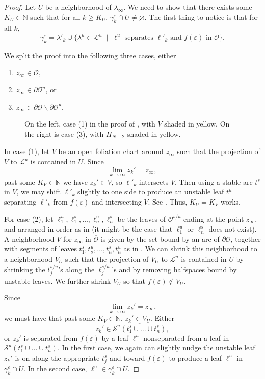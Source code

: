 \documentclass[10pt,a4paper]{amsart}
\newcommand{\N}{\mathbb{N}}
\renewcommand{\l}{\lambda}
\newcommand{\mc}{\mathcal}
\newcommand{\orb}{\mathcal{O}}
\newcommand\ssm{\smallsetminus}
\newcommand{\vep}{\varepsilon}
\begin{document}
\begin{proof}
	Let $U$ be a neighborhood of $\l_\infty$. We need to show that there exists some $K_U\in\N$ such that for all $k\geq K_U$, $\gamma^\vep_k\cap U\neq\varnothing$. The first thing to notice is that for all $k$,
	\[
	\gamma_k^\vep=\l'_k\cup\{\l^u\in\mc L^u\;\mid\;\ell^u\text{ separates }\ell'_k\text{ and }f(\vep)\text{ in }\overline{\orb}\}.
	\]
	
	We split the proof into the following three cases, either 
	\begin{enumerate}
		\item $z_\infty\in\orb$,
		\item $z_\infty\in\partial\orb^u$, or
		\item $z_\infty\in\partial\orb\ssm\partial\orb^u$.
	\end{enumerate}
	
	\begin{figure}[h]
		\centering
		
		\caption{On the left, case (1) in the proof of , with $V$ shaded in yellow. On the right is case (3), with $H_{N+2}$ shaded in yellow.}\label{fig:linf_ray}
	\end{figure}

	In case (1), let $V$ be an open foliation chart around $z_\infty$ such that the projection of $V$ to $\mc L^u$ is contained in $U$. Since 
	\[
	\lim_{k\to\infty}z_k'=z_\infty,
	\]
	past some $K_V\in\N$ we have $z_k'\in V$, so $\ell'_k$ intersects $V$. Then using a stable arc $t^s$ in $V$, we may shift $\ell'_k$ slightly to one side to produce an unstable leaf $t^u$ separating $\ell'_k$ from $f(\vep)$ and intersecting $V$. See . Thus, $K_U=K_V$ works.
	
	For case (2), let $\ell_1^u,\ell^s_1,\ldots,\ell^u_n,\ell^s_n$ be the leaves of $\orb^{s/u}$ ending at the point $z_\infty$, and arranged in order as in  (it might be the case that $\ell_1^u$ or $\ell^s_n$ does not exist). A neighborhood $V$ for $z_\infty$ in $\overline{\orb}$ is given by the set bound by an arc of $\partial\orb$, together with segments of leaves $t^s_1,t^u_s,\ldots,t^s_n,t^u_n$ as in . We can shrink this neighborhood to a neighborhood $V_U$ such that the projection of $V_U$ to $\mc L^u$ is contained in $U$ by shrinking the $t^{s/u}_j$'s along the $\ell^{s/u}_j$'s and by removing halfspaces bound by unstable leaves. We further shrink $V_U$ so that $f(\vep)\notin V_U$.

	
	Since 
	\[
	\lim_{k\to\infty}z_k'=z_\infty,
	\]
	we must have that past some $K_V\in\N$, $z_k'\in V_U$.  Either 
	\[
	z_k'\in\overline{\mc S^u(t_1^s\cup\ldots\cup t^s_n)},
	\]
	or $z_k'$ is separated from $f(\vep)$ by a leaf $\ell^u$ nonseparated from a leaf in $\mc S^u(t_1^s\cup\ldots\cup t^s_n)$. In the first case, we again can slightly nudge the unstable leaf $z_k'$ is on along the appropriate $t^s_j$ and toward $f(\vep)$ to produce a leaf $\ell^u$ in $\gamma_k^\vep\cap U$. In the second case, $\ell^u\in\gamma_k^\vep\cap U$.
	

\end{proof}
\end{document}
